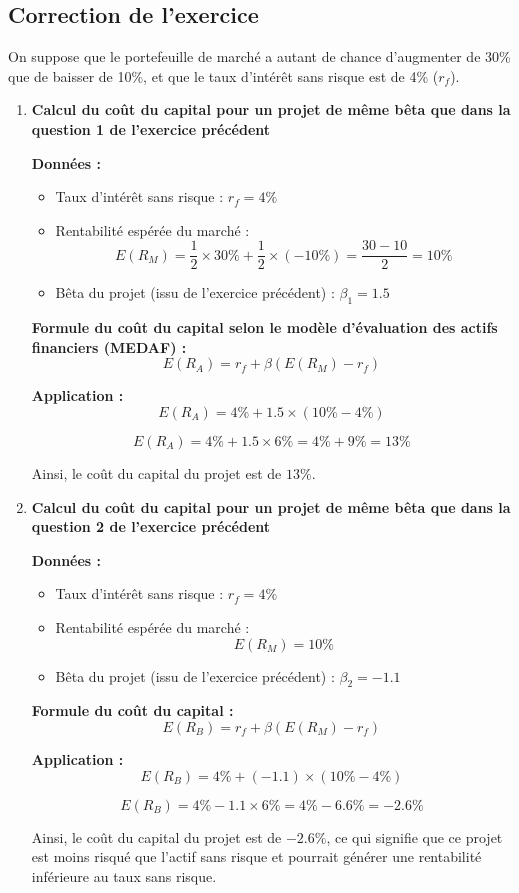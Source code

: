 \documentclass[a4paper, 12pt]{report}
\begin{document}
\subsection{Correction de l'exercice}

On suppose que le portefeuille de marché a autant de chance d'augmenter de 30\% que de baisser de 10\%, et que le taux d'intérêt sans risque est de 4\% (\( r_f \)). 

\begin{enumerate}
	\item \textbf{Calcul du coût du capital pour un projet de même bêta que dans la question 1 de l'exercice précédent}
	
	\textbf{Données :}
	\begin{itemize}
		\item Taux d'intérêt sans risque : \( r_f = 4\% \)
		\item Rentabilité espérée du marché : 
		\[
		E(R_M) = \frac{1}{2} \times 30\% + \frac{1}{2} \times (-10\%) = \frac{30 - 10}{2} = 10\%
		\]
		\item Bêta du projet (issu de l'exercice précédent) : \( \beta_1 = 1.5 \)
	\end{itemize}
	
	\textbf{Formule du coût du capital selon le modèle d'évaluation des actifs financiers (MEDAF) :}
	\[
	E(R_A) = r_f + \beta (E(R_M) - r_f)
	\]
	
	\textbf{Application :}
	\[
	E(R_A) = 4\% + 1.5 \times (10\% - 4\%)
	\]
	
	\[
	E(R_A) = 4\% + 1.5 \times 6\% = 4\% + 9\% = 13\%
	\]
	
	Ainsi, le coût du capital du projet est de \( 13\% \).
	
	\item \textbf{Calcul du coût du capital pour un projet de même bêta que dans la question 2 de l'exercice précédent}
	
	\textbf{Données :}
	\begin{itemize}
		\item Taux d'intérêt sans risque : \( r_f = 4\% \)
		\item Rentabilité espérée du marché : 
		\[
		E(R_M) = 10\%
		\]
		\item Bêta du projet (issu de l'exercice précédent) : \( \beta_2 = -1.1 \)
	\end{itemize}
	
	\textbf{Formule du coût du capital :}
	\[
	E(R_B) = r_f + \beta (E(R_M) - r_f)
	\]
	
	\textbf{Application :}
	\[
	E(R_B) = 4\% + (-1.1) \times (10\% - 4\%)
	\]
	
	\[
	E(R_B) = 4\% - 1.1 \times 6\% = 4\% - 6.6\% = -2.6\%
	\]
	
	Ainsi, le coût du capital du projet est de \( -2.6\% \), ce qui signifie que ce projet est moins risqué que l'actif sans risque et pourrait générer une rentabilité inférieure au taux sans risque.
	
\end{enumerate}
\end{document}
